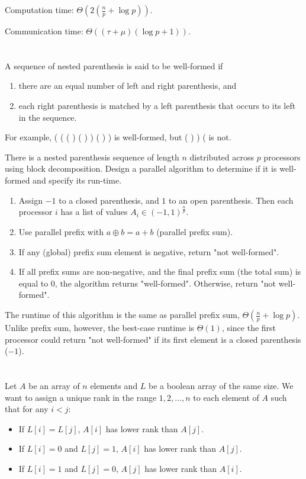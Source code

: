 \documentclass{article}
\newcommand{\?}{\stackrel{?}{=}}
\begin{document}
\quad Computation time: $\Theta(2\left(\frac{n}{p} + \log{p}\right))$.

\quad Communication time: $\Theta(\left(\tau + \mu\right)(\log{p} + 1))$.

\section{}

A sequence of nested parenthesis is said to be well-formed if
\begin{enumerate}
  \item there are an equal number of left and right parenthesis, and
  \item each right parenthesis is matched by a left parenthesis that occurs to its left in the sequence.
\end{enumerate}
For example, ( ( ( ) ( ) ) ( ) ) is well-formed, but ( ) ) ( is not.

There is a nested parenthesis sequence of length $n$ distributed across $p$ processors using block decomposition.
Design a parallel algorithm to determine if it is well-formed and specify its run-time.

\begin{enumerate}
  \item Assign $-1$ to a closed parenthesis, and $1$ to an open parenthesis.
      Then each processor $i$ has a list of values $A_i \in \left(-1, 1\right)^\frac{n}{p}$.
  \item Use parallel prefix with $a \oplus b = a + b$ (parallel prefix sum).
  \item If any (global) prefix sum element is negative, return "not well-formed".
  \item If all prefix sums are non-negative, and the final prefix sum (the total sum) is equal to $0$, the algorithm returns "well-formed".
      Otherwise, return "not well-formed".
\end{enumerate}

The runtime of this algorithm is the same as parallel prefix sum, $\Theta(\frac{n}{p} + \log{p})$.
Unlike prefix sum, however, the best-case runtime is $\Theta(1)$, since the first processor could return "not well-formed" if its first element is a closed parenthesis ($-1$).

\section{}

Let $A$ be an array of $n$ elements and $L$ be a boolean array of the same size.
We want to assign a unique rank in the range $1, 2, ..., n$ to each element of $A$ such that for any $i < j$:
\begin{itemize}
\item If $L[i] = L[j]$, $A[i]$ has lower rank than $A[j]$.
\item If $L[i] = 0$ and $L[j] = 1$, $A[i]$ has lower rank than $A[j]$.
\item If $L[i] = 1$ and $L[j] = 0$, $A[j]$ has lower rank than $A[i]$.
\end{itemize}
\end{document}
